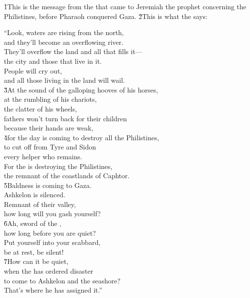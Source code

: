 \v{1}This is the message from the  that came to Jeremiah the prophet concerning the Philistines, before Pharaoh conquered Gaza. \v{2}This is what the  says:

\begin{poetry}
\poeml ``Look, waters are rising from the north, \\
\poemll    and they'll become an overflowing river. \\
\poeml They'll overflow the land and all that fills it--- \\
\poemll    the city and those that live in it. \\
\poeml People will cry out, \\
\poemll    and all those living in the land will wail. \\
\poeml \v{3}At the sound of the galloping hooves of his horses, \\
\poemll    at the rumbling of his chariots, \\
\poemlll       the clatter of his wheels, \\
\poeml fathers won't turn back for their children \\
\poemll    because their hands are weak, \\
\poeml \v{4}for the day is coming to destroy all the Philistines, \\
\poemll    to cut off from Tyre and Sidon \\
\poemlll       every helper who remains. \\
\poeml For the  is destroying the Philistines, \\
\poemll    the remnant of the coastlands of Caphtor. \\
\poeml \v{5}Baldness is coming to Gaza. \\
\poemll    Ashkelon is silenced. \\
\poeml Remnant of their valley, \\
\poemll    how long will you gash yourself? \\
\poeml \v{6}Ah, sword of the , \\
\poemll    how long before you are quiet? \\
\poeml Put yourself into your scabbard, \\
\poemll    be at rest, be silent! \\
\poeml \v{7}How can it be quiet, \\
\poemll    when the  has ordered disaster \\
\poeml to come to Ashkelon and the seashore? \\
\poemll    That's where he has assigned it.''
\end{poetry}

